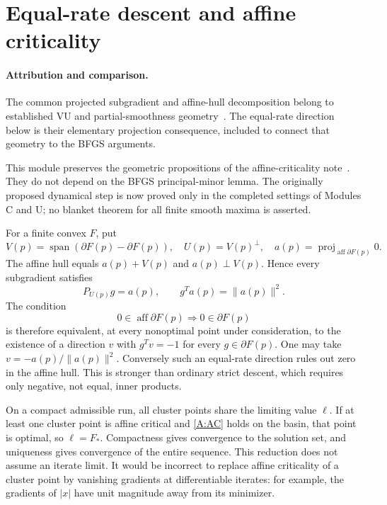 \section{Equal-rate descent and affine criticality}
\paragraph{Attribution and comparison.}
The common projected subgradient and affine-hull decomposition belong to established VU and partial-smoothness geometry~\cite{geom_Lewis2002,LL}. The equal-rate direction below is their elementary projection consequence, included to connect that geometry to the BFGS arguments.

This module preserves the geometric propositions of the affine-criticality note~\cite{SA}. They do not depend on the BFGS principal-minor lemma. The originally proposed dynamical step is now proved only in the completed settings of Modules C and U; no blanket theorem for all finite smooth maxima is asserted.

For a finite convex $F$, put
\[
 V(p)=\operatorname{span}(\partial F(p)-\partial F(p)),\quad U(p)=V(p)^\perp,
 \quad a(p)=\operatorname{proj}_{\operatorname{aff}\partial F(p)}0.
\]
The affine hull equals $a(p)+V(p)$ and $a(p)\perp V(p)$. Hence every subgradient satisfies
\[
 P_{U(p)}g=a(p),\qquad g^Ta(p)=\|a(p)\|^2.
\]
The condition
\begin{equation}\label{A:AC}
 0\in\operatorname{aff}\partial F(p)\Longrightarrow0\in\partial F(p)
\end{equation}
is therefore equivalent, at every nonoptimal point under consideration, to the existence of a direction $v$ with $g^Tv=-1$ for every $g\in\partial F(p)$. One may take $v=-a(p)/\|a(p)\|^2$. Conversely such an equal-rate direction rules out zero in the affine hull. This is stronger than ordinary strict descent, which requires only negative, not equal, inner products.

On a compact admissible run, all cluster points share the limiting value $\ell$. If at least one cluster point is affine critical and \eqref{A:AC} holds on the basin, that point is optimal, so $\ell=F_*$. Compactness gives convergence to the solution set, and uniqueness gives convergence of the entire sequence. This reduction does not assume an iterate limit. It would be incorrect to replace affine criticality of a cluster point by vanishing gradients at differentiable iterates: for example, the gradients of $|x|$ have unit magnitude away from its minimizer.

